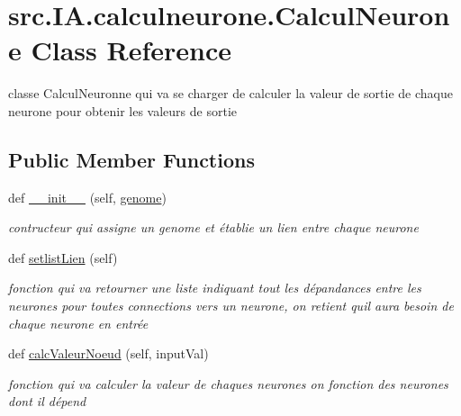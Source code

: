 \hypertarget{classsrc_1_1_i_a_1_1calculneurone_1_1_calcul_neurone}{}\section{src.\+I\+A.\+calculneurone.\+Calcul\+Neurone Class Reference}
\label{classsrc_1_1_i_a_1_1calculneurone_1_1_calcul_neurone}


classe Calcul\+Neuronne qui va se charger de calculer la valeur de sortie de chaque neurone pour obtenir les valeurs de sortie  


\subsection*{Public Member Functions}
\begin{DoxyCompactItemize}
\item 
def \hyperlink{classsrc_1_1_i_a_1_1calculneurone_1_1_calcul_neurone_afe5ce9166d3419eb900db1d3a3801ba7}{\+\_\+\+\_\+init\+\_\+\+\_\+} (self, \hyperlink{classsrc_1_1_i_a_1_1calculneurone_1_1_calcul_neurone_a72f88c170dedc7b9fff3200986e5dafc}{genome})
\begin{DoxyCompactList}\small\item\em contructeur qui assigne un genome et établie un lien entre chaque neurone \end{DoxyCompactList}\item 
def \hyperlink{classsrc_1_1_i_a_1_1calculneurone_1_1_calcul_neurone_a5a2eac40e09b30ac192f13c5486c54ad}{setlist\+Lien} (self)
\begin{DoxyCompactList}\small\item\em fonction qui va retourner une liste indiquant tout les dépandances entre les neurones pour toutes connections vers un neurone, on retient qu\textquotesingle{}il aura besoin de chaque neurone en entrée \end{DoxyCompactList}\item 
def \hyperlink{classsrc_1_1_i_a_1_1calculneurone_1_1_calcul_neurone_ad7667fe4e8a57f0fb89766c1d4db9488}{calc\+Valeur\+Noeud} (self, input\+Val)
\begin{DoxyCompactList}\small\item\em fonction qui va calculer la valeur de chaques neurones on fonction des neurones dont il dépend \end{DoxyCompactList}\end{DoxyCompactItemize}
